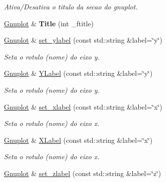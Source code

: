 \begin{DoxyCompactItemize}
\begin{DoxyCompactList}\small\item\em Ativa/\-Desativa o titulo da secao do gnuplot. \end{DoxyCompactList}\item 
\hypertarget{classGnuplot_afeab18e210616ae239adb7d816ecb2e9}{\hyperlink{classGnuplot}{Gnuplot} \& {\bfseries Title} (int \-\_\-ftitle)}\label{classGnuplot_afeab18e210616ae239adb7d816ecb2e9}

\item 
\hypertarget{classGnuplot_a7654b86e3873aec4c5101abb466fe4ab}{\hyperlink{classGnuplot}{Gnuplot} \& \hyperlink{classGnuplot_a7654b86e3873aec4c5101abb466fe4ab}{set\-\_\-ylabel} (const std\-::string \&label=\char`\"{}y\char`\"{})}\label{classGnuplot_a7654b86e3873aec4c5101abb466fe4ab}

\begin{DoxyCompactList}\small\item\em Seta o rotulo (nome) do eixo y. \end{DoxyCompactList}\item 
\hypertarget{classGnuplot_ab4cdb8c1abd919b9851ca9a81667f2a4}{\hyperlink{classGnuplot}{Gnuplot} \& \hyperlink{classGnuplot_ab4cdb8c1abd919b9851ca9a81667f2a4}{Y\-Label} (const std\-::string \&label=\char`\"{}y\char`\"{})}\label{classGnuplot_ab4cdb8c1abd919b9851ca9a81667f2a4}

\begin{DoxyCompactList}\small\item\em Seta o rotulo (nome) do eixo y. \end{DoxyCompactList}\item 
\hypertarget{classGnuplot_a58808028aec03a22b5c19693b14baeef}{\hyperlink{classGnuplot}{Gnuplot} \& \hyperlink{classGnuplot_a58808028aec03a22b5c19693b14baeef}{set\-\_\-xlabel} (const std\-::string \&label=\char`\"{}x\char`\"{})}\label{classGnuplot_a58808028aec03a22b5c19693b14baeef}

\begin{DoxyCompactList}\small\item\em Seta o rotulo (nome) do eixo x. \end{DoxyCompactList}\item 
\hypertarget{classGnuplot_ac36ea75f0759c98da946389e60c12278}{\hyperlink{classGnuplot}{Gnuplot} \& \hyperlink{classGnuplot_ac36ea75f0759c98da946389e60c12278}{X\-Label} (const std\-::string \&label=\char`\"{}x\char`\"{})}\label{classGnuplot_ac36ea75f0759c98da946389e60c12278}

\begin{DoxyCompactList}\small\item\em Seta o rotulo (nome) do eixo x. \end{DoxyCompactList}\item 
\hypertarget{classGnuplot_ab3206e715d20f05cc0dd1eec89ce8b07}{\hyperlink{classGnuplot}{Gnuplot} \& \hyperlink{classGnuplot_ab3206e715d20f05cc0dd1eec89ce8b07}{set\-\_\-zlabel} (const std\-::string \&label=\char`\"{}z\char`\"{})}\label{classGnuplot_ab3206e715d20f05cc0dd1eec89ce8b07}


\end{DoxyCompactItemize}
